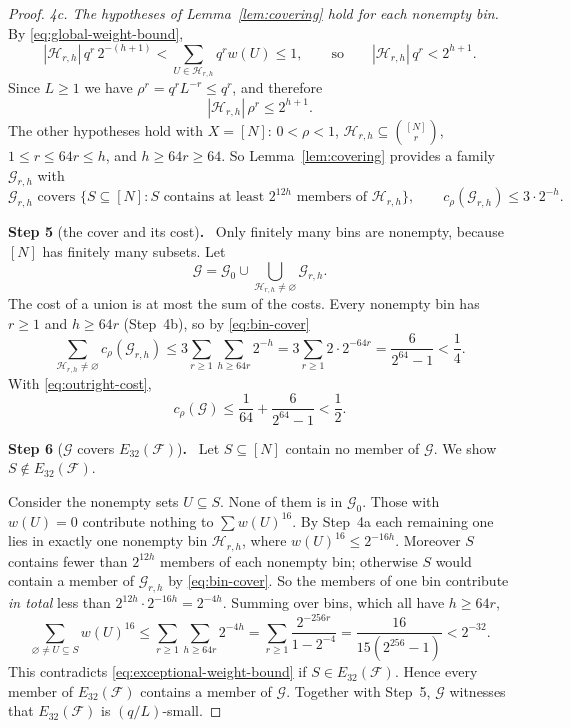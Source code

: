 \documentclass[11pt,letterpaper]{article}
\theoremstyle{definition}
\theoremstyle{remark}
\numberwithin{equation}{section}
\newcommand{\step}[2]{\medskip\noindent\textbf{Step #1} (#2)\textbf{.}\ }
\begin{document}
\begin{proof}
\emph{4c. The hypotheses of Lemma~\ref{lem:covering} hold for each
nonempty bin.} By \eqref{eq:global-weight-bound},
\[
 |\mathcal H_{r,h}|\,q^r\,2^{-(h+1)}
 <\sum_{U\in\mathcal H_{r,h}}q^r w(U)\le1,
 \qquad\text{so}\qquad |\mathcal H_{r,h}|\,q^r<2^{h+1}.
\]
Since $L\ge1$ we have $\rho^r=q^rL^{-r}\le q^r$, and therefore
\[
 |\mathcal H_{r,h}|\,\rho^r\le2^{h+1}.
\]
The other hypotheses hold with $X=[N]$: $0<\rho<1$,
$\mathcal H_{r,h}\subseteq\binom{[N]}{r}$, $1\le r\le64r\le h$, and
$h\ge64r\ge64$. So Lemma~\ref{lem:covering} provides a family
$\mathcal G_{r,h}$ with
\begin{equation}\label{eq:bin-cover}
\mathcal G_{r,h}\text{ covers }
\bigl\{S\subseteq[N]:S\text{ contains at least }2^{12h}\text{ members of }
\mathcal H_{r,h}\bigr\},
\qquad
 c_\rho(\mathcal G_{r,h})\le3\cdot2^{-h}.
\end{equation}

\step{5}{the cover and its cost}
Only finitely many bins are nonempty, because $[N]$ has finitely many
subsets. Let
\[
 \mathcal G=\mathcal G_0\cup\bigcup_{\mathcal H_{r,h}\ne\varnothing}
 \mathcal G_{r,h}.
\]
The cost of a union is at most the sum of the costs. Every nonempty bin
has $r\ge1$ and $h\ge64r$ (Step~4b), so by \eqref{eq:bin-cover}
\begin{equation}\label{eq:bin-cost-sum}
 \sum_{\mathcal H_{r,h}\ne\varnothing}c_\rho(\mathcal G_{r,h})
 \le3\sum_{r\ge1}\sum_{h\ge64r}2^{-h}
 =3\sum_{r\ge1}2\cdot2^{-64r}
 =\frac{6}{2^{64}-1}<\frac14 .
\end{equation}
With \eqref{eq:outright-cost},
\[
 c_\rho(\mathcal G)
 \le\frac1{64}+\frac{6}{2^{64}-1}<\frac12.
\]

\step{6}{$\mathcal G$ covers $E_{32}(\mathcal F)$}
Let $S\subseteq[N]$ contain no member of $\mathcal G$. We show
$S\notin E_{32}(\mathcal F)$.

Consider the nonempty sets $U\subseteq S$. None of them is in
$\mathcal G_0$. Those with $w(U)=0$ contribute nothing to
$\sum w(U)^{16}$. By Step~4a each remaining one lies in exactly one
nonempty bin $\mathcal H_{r,h}$, where $w(U)^{16}\le2^{-16h}$. Moreover
$S$ contains fewer than $2^{12h}$ members of each nonempty bin; otherwise
$S$ would contain a member of $\mathcal G_{r,h}$ by \eqref{eq:bin-cover}.
So the members of one bin contribute \emph{in total} less than
$2^{12h}\cdot2^{-16h}=2^{-4h}$. Summing over bins, which all have
$h\ge64r$,
\begin{equation}\label{eq:bin-power-sum}
 \sum_{\varnothing\ne U\subseteq S}w(U)^{16}
 \le\sum_{r\ge1}\sum_{h\ge64r}2^{-4h}
 =\sum_{r\ge1}\frac{2^{-256r}}{1-2^{-4}}
 =\frac{16}{15(2^{256}-1)}<2^{-32}.
\end{equation}
This contradicts \eqref{eq:exceptional-weight-bound} if
$S\in E_{32}(\mathcal F)$. Hence every member of $E_{32}(\mathcal F)$
contains a member of $\mathcal G$. Together with Step~5, $\mathcal G$
witnesses that $E_{32}(\mathcal F)$ is $(q/L)$-small.
\end{proof}
\end{document}
